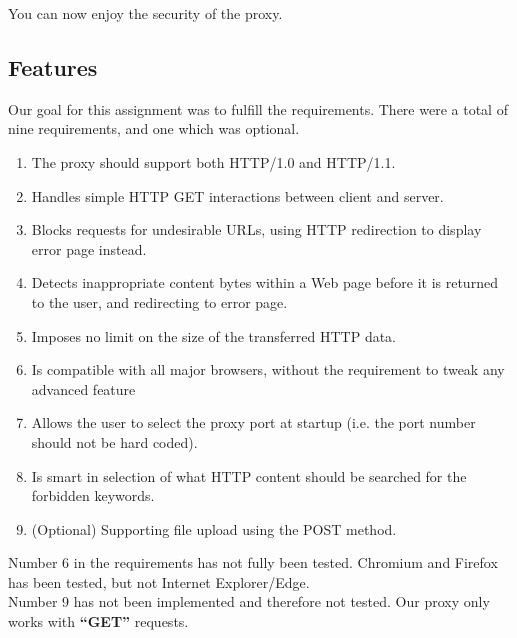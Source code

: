 \documentclass{mall}
\begin{document}
You can now enjoy the security of the proxy.

\pagebreak
\subsection{Features}
Our goal for this assignment was to fulfill the requirements. There were a total of nine requirements, and one which was optional.
\begin{enumerate}
\item The proxy should support both HTTP/1.0 and HTTP/1.1.
\item Handles simple HTTP GET interactions between client and server.
\item Blocks requests for undesirable URLs, using HTTP redirection to display error page instead.
\item Detects inappropriate content bytes within a Web page before it is returned to the user, and redirecting to error page.
\item Imposes no limit on the size of the transferred HTTP data.
\item Is compatible with all major browsers, without the requirement to tweak any advanced feature
\item Allows the user to select the proxy port at startup (i.e. the port number should not be hard coded).
\item Is smart in selection of what HTTP content should be searched for the forbidden keywords.
\item (Optional) Supporting file upload using the POST method.\\
\end{enumerate}
\setlength{\parindent}{0mm}
Number 6 in the requirements has not fully been tested. Chromium and Firefox has been tested, but not Internet Explorer/Edge.\\
Number 9 has not been implemented and therefore not tested. Our proxy only works with \textbf{``GET''} requests.
\end{document}
